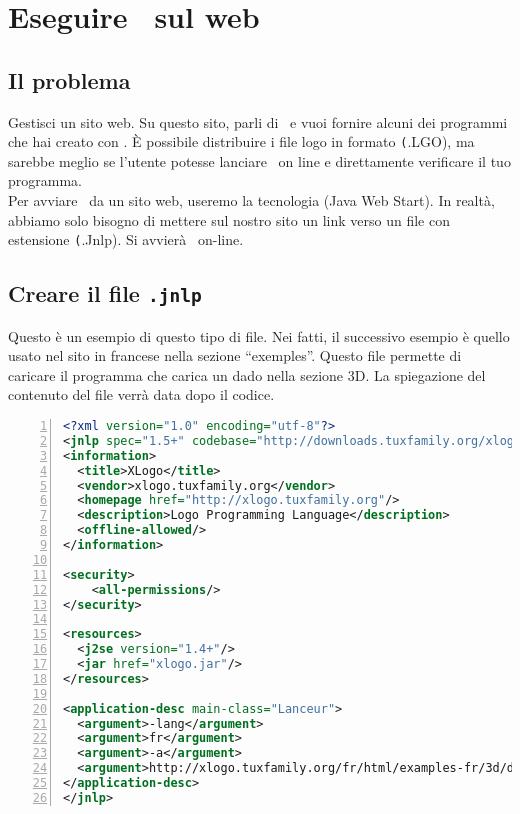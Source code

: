 \chapter{Eseguire \xlogo\ sul web}
\section{Il problema}

Gestisci un sito web. Su questo sito, parli di \xlogo\ e vuoi fornire alcuni dei programmi che hai creato con \xlogo. È possibile distribuire i file logo in formato \texttt (.LGO), ma sarebbe meglio se l'utente potesse lanciare \xlogo\ on line e direttamente verificare il tuo programma.\\

Per avviare \xlogo\ da un sito web, useremo la tecnologia \textsc(Java Web Start). In realtà, abbiamo solo bisogno di mettere sul nostro sito un link verso un file con estensione \texttt(.Jnlp). Si avvierà \xlogo\ on-line.

\section{Creare il file \texttt{.jnlp}}
Questo è un esempio di questo tipo di file. Nei fatti, il successivo esempio è quello usato nel sito in francese nella sezione ``exemples''. Questo file permette di caricare il programma che carica un dado nella sezione 3D. La spiegazione del contenuto del file verrà data dopo il codice.

\begin{lstlisting}[language=XML, numbers=left, numberstyle=\tiny]
 <?xml version="1.0" encoding="utf-8"?>
<jnlp spec="1.5+" codebase="http://downloads.tuxfamily.org/xlogo/common/webstart">
<information>
  <title>XLogo</title>
  <vendor>xlogo.tuxfamily.org</vendor>
  <homepage href="http://xlogo.tuxfamily.org"/>
  <description>Logo Programming Language</description>
  <offline-allowed/>
</information>

<security>
	<all-permissions/>
</security>

<resources>
  <j2se version="1.4+"/>
  <jar href="xlogo.jar"/>
</resources>

<application-desc main-class="Lanceur">
  <argument>-lang</argument>
  <argument>fr</argument>
  <argument>-a</argument>
  <argument>http://xlogo.tuxfamily.org/fr/html/examples-fr/3d/de.lgo</argument>
</application-desc>
</jnlp>

\end{lstlisting}

